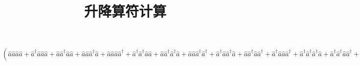  \title{升降算符计算}
 
 \maketitle
 $(
 \hat{a}
 \hat{a}
 \hat{a}
 \hat{a}
 +
 \hat{a}^\dagger
 \hat{a}
 \hat{a}
 \hat{a}
 +
 \hat{a}
 \hat{a}^\dagger
 \hat{a}
 \hat{a}
 +
 \hat{a}
 \hat{a}
 \hat{a}^\dagger
 \hat{a}
 +
 \hat{a}
 \hat{a}
 \hat{a}
 \hat{a}^\dagger
 +
 \hat{a}^\dagger
 \hat{a}^\dagger
 \hat{a}
 \hat{a}
 +
 \hat{a}
 \hat{a}^\dagger
 \hat{a}^\dagger
 \hat{a}
 +
 \hat{a}
 \hat{a}
 \hat{a}^\dagger
 \hat{a}^\dagger
 +
 \hat{a}^\dagger
 \hat{a}
 \hat{a}^\dagger
 \hat{a}
 +
 \hat{a}
 \hat{a}^\dagger
 \hat{a}
 \hat{a}^\dagger
 +
 \hat{a}^\dagger
 \hat{a}
 \hat{a}
 \hat{a}^\dagger
 +
 \hat{a}^\dagger
 \hat{a}^\dagger
 \hat{a}^\dagger
 \hat{a}
 +
 \hat{a}^\dagger
 \hat{a}^\dagger
 \hat{a}
 \hat{a}^\dagger
 +
 \hat{a}^\dagger
 \hat{a}
 \hat{a}^\dagger
 \hat{a}^\dagger
 +
 \hat{a}
 \hat{a}^\dagger
 \hat{a}^\dagger
 \hat{a}^\dagger
 +
 \hat{a}^\dagger
 \hat{a}^\dagger
 \hat{a}^\dagger
 \hat{a}^\dagger
 )
 |           2 \rangle =
 \sqrt{           2 }|           0 \rangle
 +
 \sqrt{           8 }|           0 \rangle
 +
 \sqrt{          18 }|           0 \rangle
 +
 \sqrt{           4 }|           2 \rangle
 +
 \sqrt{          36 }|           2 \rangle
 +
 \sqrt{         144 }|           2 \rangle
 +
 \sqrt{          16 }|           2 \rangle
 +
 \sqrt{          81 }|           2 \rangle
 +
 \sqrt{          36 }|           2 \rangle
 +
 \sqrt{          48 }|           4 \rangle
 +
 \sqrt{         108 }|           4 \rangle
 +
 \sqrt{         192 }|           4 \rangle
 +
 \sqrt{         300 }|           4 \rangle
 +
 \sqrt{         360 }|           6 \rangle
 $
 
